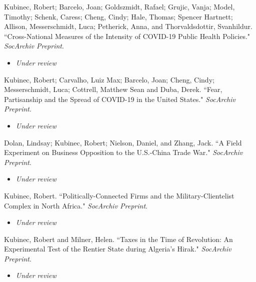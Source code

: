\documentclass[11pt, a4paper]{article}
\newcommand{\years}[1]{\marginnote{\scriptsize #1}}
\begin{document}
\years{2022} Kubinec, Robert; Barcelo, Joan; Goldszmidt, Rafael; Grujic, Vanja; Model, Timothy; Schenk, Caress; Cheng, Cindy; Hale, Thomas; Spencer Hartnett; Allison, Messerschmidt, Luca; Petherick, Anna, and Thorvaldsdottir, Svanhildur. ``Cross-National Measures of the Intensity of COVID-19 Public Health Policies." \emph{SocArchiv Preprint}. \\

\begin{itemize}
	\item \emph{Under review}
\end{itemize}

\years{2022} Kubinec, Robert; Carvalho, Luiz Max; Barcelo, Joan; Cheng, Cindy; Messerschmidt, Luca; Cottrell, Matthew Sean and Duba, Derek. ``Fear, Partisanship and the Spread of COVID-19 in the United States." \emph{SocArchiv Preprint}. \\

\begin{itemize}
	\item \emph{Under review}
\end{itemize}

\years{2022} Dolan, Lindsay; Kubinec, Robert; Nielson, Daniel, and Zhang, Jack. ``A Field Experiment on Business Opposition to the U.S.-China Trade War." \emph{SocArchiv Preprint}. \\

\begin{itemize}
	\item \emph{Under review}
\end{itemize}

\years{2022} Kubinec, Robert. ``Politically-Connected Firms and the Military-Clientelist Complex in North Africa." \emph{SocArchiv Preprint}. \\

\begin{itemize}
	\item \emph{Under review}
\end{itemize}

\years{2022} Kubinec, Robert and Milner, Helen. ``Taxes in the Time of Revolution: An Experimental Test of the Rentier State during Algeria's Hirak." \emph{SocArchiv Preprint}. \\

\begin{itemize}
	\item \emph{Under review}
\end{itemize}
\end{document}
